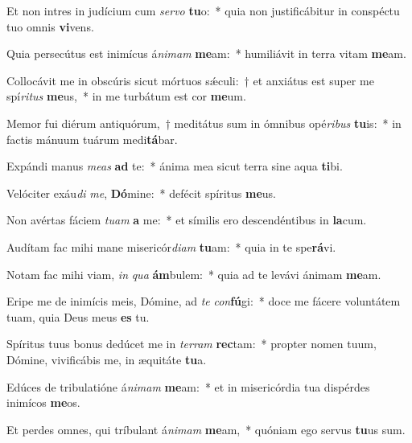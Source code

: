 \item Et non intres in judícium cum \textit{ser}\textit{vo} \textbf{tu}o:~* quia non justificábitur in conspéctu tuo omnis \textbf{vi}vens.
\item Quia persecútus est inimícus á\textit{ni}\textit{mam} \textbf{me}am:~* humiliávit in terra vitam \textbf{me}am.
\item Collocávit me in obscúris sicut mórtuos sǽculi:~† et anxiátus est super me spí\textit{ri}\textit{tus} \textbf{me}us,~* in me turbátum est cor \textbf{me}um.
\item Memor fui diérum antiquórum,~† meditátus sum in ómnibus opé\textit{ri}\textit{bus} \textbf{tu}is:~* in factis mánuum tuárum medi\textbf{tá}bar.
\item Expándi manus \textit{me}\textit{as} \textbf{ad} te:~* ánima mea sicut terra sine aqua \textbf{ti}bi.
\item Velóciter exáu\textit{di} \textit{me}, \textbf{Dó}mine:~* defécit spíritus \textbf{me}us.
\item Non avértas fáciem \textit{tu}\textit{am} \textbf{a} me:~* et símilis ero descendéntibus in \textbf{la}cum.
\item Audítam fac mihi mane misericór\textit{di}\textit{am} \textbf{tu}am:~* quia in te spe\textbf{rá}vi.
\item Notam fac mihi viam, \textit{in} \textit{qua} \textbf{ám}bulem:~* quia ad te levávi ánimam \textbf{me}am.
\item Eripe me de inimícis meis, Dómine, ad \textit{te} \textit{con}\textbf{fú}gi:~* doce me fácere voluntátem tuam, quia Deus meus \textbf{es} tu.
\item Spíritus tuus bonus dedúcet me in \textit{ter}\textit{ram} \textbf{rec}tam:~* propter nomen tuum, Dómine, vivificábis me, in æquitáte \textbf{tu}a.
\item Edúces de tribulatióne á\textit{ni}\textit{mam} \textbf{me}am:~* et in misericórdia tua dispérdes inimícos \textbf{me}os.
\item Et perdes omnes, qui tríbulant á\textit{ni}\textit{mam} \textbf{me}am,~* quóniam ego servus \textbf{tu}us sum.
